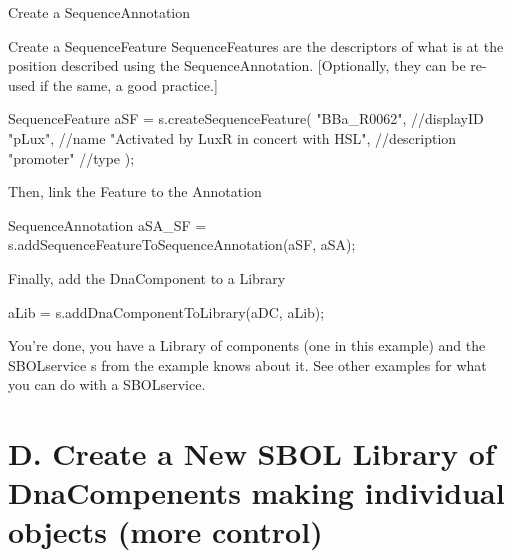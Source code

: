 \begin{DoxyEnumerate}
\begin{DoxyParagraph}{Create a SequenceAnnotation}
\end{DoxyParagraph}

\item \begin{DoxyParagraph}{Create a SequenceFeature}
SequenceFeatures are the descriptors of what is at the position described using the SequenceAnnotation. \mbox{[}Optionally, they can be re-\/used if the same, a good practice.\mbox{]} 
\begin{DoxyCode}
SequenceFeature aSF = s.createSequenceFeature(
            "BBa_R0062",                             //displayID
            "pLux",                                  //name
            "Activated by LuxR in concert with HSL", //description
            "promoter"                               //type
            );
\end{DoxyCode}

\end{DoxyParagraph}

\item \begin{DoxyParagraph}{Then, link the Feature to the Annotation}

\begin{DoxyCode}
SequenceAnnotation aSA_SF = s.addSequenceFeatureToSequenceAnnotation(aSF, aSA);
\end{DoxyCode}

\end{DoxyParagraph}

\item \begin{DoxyParagraph}{Finally, add the DnaComponent to a Library}

\begin{DoxyCode}
aLib = s.addDnaComponentToLibrary(aDC, aLib);
\end{DoxyCode}

\end{DoxyParagraph}
You're done, you have a Library of components (one in this example) and the SBOLservice {\ttfamily s} from the example knows about it. See other examples for what you can do with a SBOLservice.
\end{DoxyEnumerate}



 \hypertarget{tutorial_D}{}\section{D. Create a New SBOL Library of DnaCompenents making individual objects (more control)}\label{tutorial_D}

